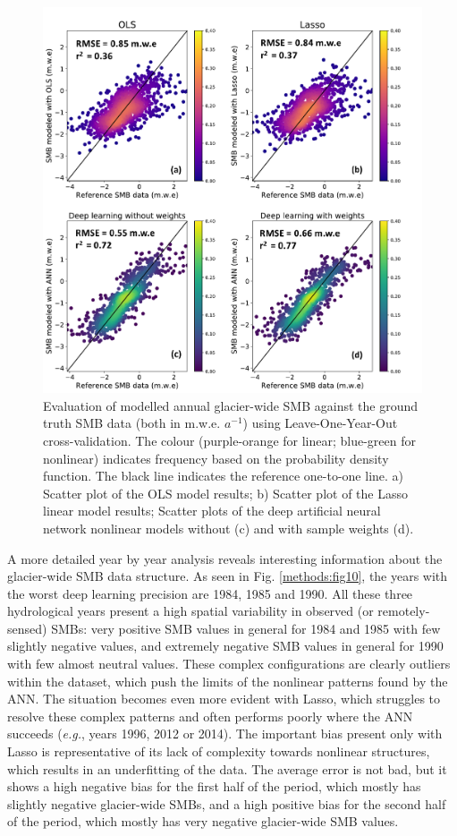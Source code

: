 \begin{figure}[h]
\centering
\includegraphics[width=12cm]{Figures/methods/Figure_9.pdf}
\caption{Evaluation of modelled annual glacier-wide SMB against the ground truth SMB data (both in m.w.e. $ a^{-1}$) using Leave-One-Year-Out cross-validation. The colour (purple-orange for linear; blue-green for nonlinear) indicates frequency based on the probability density function. The black line indicates the reference one-to-one line. a) Scatter plot of the OLS model results; b) Scatter plot of the Lasso linear model results; Scatter plots of the deep artificial neural network nonlinear models without (c) and with sample weights (d).}
\label{methods:fig9}
\end{figure}

A more detailed year by year analysis reveals interesting information about the glacier-wide SMB data structure. As seen in Fig. \ref{methods:fig10}, the years with the worst deep learning precision are 1984, 1985 and 1990. All these three hydrological years present a high spatial variability in observed (or remotely-sensed) SMBs: very positive SMB values in general for 1984 and 1985 with few slightly negative values, and extremely negative SMB values in general for 1990 with few almost neutral values. These complex configurations are clearly outliers within the dataset, which push the limits of the nonlinear patterns found by the ANN. The situation becomes even more evident with Lasso, which struggles to resolve these complex patterns and often performs poorly where the ANN succeeds (\textit{e.g.}, years 1996, 2012 or 2014). The important bias present only with Lasso is representative of its lack of complexity towards nonlinear structures, which results in an underfitting of the data. The average error is not bad, but it shows a high negative bias for the first half of the period, which mostly has slightly negative glacier-wide SMBs, and a high positive bias for the second half of the period, which mostly has very negative glacier-wide SMB values.

